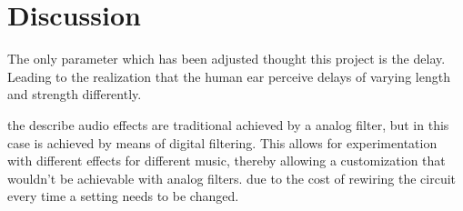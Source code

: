 \clearpage
\section{Discussion}
The only parameter which has been adjusted thought this project is the delay. Leading to the realization that the human ear perceive delays of varying length and strength differently. 

the describe audio effects are traditional achieved by a analog filter, but in this case is achieved by means of digital filtering.
This allows for experimentation with different effects for different music, thereby allowing a customization that wouldn't be achievable with analog filters.
due to the cost of rewiring the circuit every time a setting needs to be changed.
